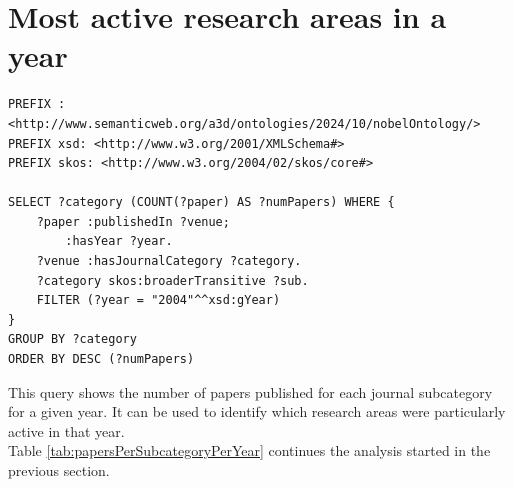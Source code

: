 \documentclass{article}
\begin{document}
\section{Most active research areas in a year} \label{moreActiveResearchAreas}
\begin{lstlisting}
PREFIX : <http://www.semanticweb.org/a3d/ontologies/2024/10/nobelOntology/>
PREFIX xsd: <http://www.w3.org/2001/XMLSchema#>
PREFIX skos: <http://www.w3.org/2004/02/skos/core#>

SELECT ?category (COUNT(?paper) AS ?numPapers) WHERE {
    ?paper :publishedIn ?venue;
        :hasYear ?year.
    ?venue :hasJournalCategory ?category.
    ?category skos:broaderTransitive ?sub.
    FILTER (?year = "2004"^^xsd:gYear)
}
GROUP BY ?category
ORDER BY DESC (?numPapers)
\end{lstlisting}

This query shows the number of papers published for each journal subcategory for a given year.
It can be used to identify which research areas were particularly active in that year.\\
Table \ref{tab:papersPerSubcategoryPerYear} continues the analysis started in the previous section.
\end{document}
